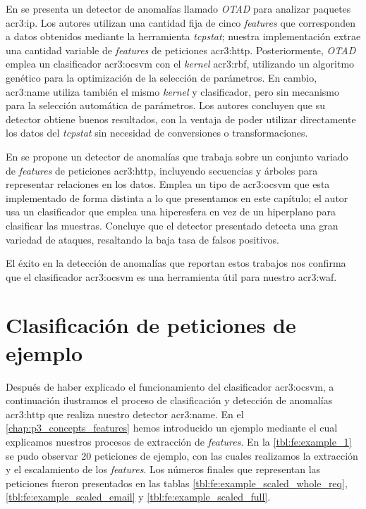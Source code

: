En \citep{tran2004one} se presenta un detector de anomalías llamado
\textit{OTAD} para analizar paquetes \gls{acr3:ip}. Los autores utilizan
una cantidad fija de cinco \textit{features} que corresponden a datos
obtenidos mediante la herramienta \textit{tcpstat}; nuestra implementación
extrae una cantidad variable de \textit{features} de peticiones
\gls{acr3:http}.
Posteriormente, \textit{OTAD} emplea un clasificador \gls{acr3:ocsvm}
con el \textit{kernel} \gls{acr3:rbf}, utilizando un algoritmo genético
para la optimización de la selección de parámetros. En cambio, \gls{acr3:name}
utiliza también el mismo \textit{kernel} y clasificador, pero sin mecanismo
para la selección automática de parámetros.
Los autores concluyen que su detector obtiene buenos resultados, con la
ventaja de poder utilizar directamente los datos del \textit{tcpstat}
sin necesidad de conversiones o transformaciones.

En \citep{rieck2009machine} se propone un detector de anomalías que trabaja
sobre un conjunto variado de \textit{features} de peticiones \gls{acr3:http},
incluyendo secuencias y árboles para representar relaciones en los datos.
Emplea un tipo de \gls{acr3:ocsvm} que esta implementado de forma distinta
a lo que presentamos en este capítulo; el autor usa un clasificador que
emplea una hiperesfera en vez de un hiperplano para clasificar las muestras.
Concluye que el detector presentado detecta una gran variedad de ataques,
resaltando la baja tasa de falsos positivos.

El éxito en la detección de anomalías que reportan estos trabajos nos
confirma que el clasificador \gls{acr3:ocsvm} es una herramienta útil
para nuestro \gls{acr3:waf}.


\section{Clasificación de peticiones de ejemplo}

Después de haber explicado el funcionamiento del clasificador \gls{acr3:ocsvm},
a continuación ilustramos el proceso de clasificación y detección de
anomalías \gls{acr3:http} que realiza nuestro detector \gls{acr3:name}.
En el \autoref{chap:p3_concepts_features} hemos introducido un ejemplo
mediante el cual explicamos nuestros procesos de extracción de \textit{features}.
En la \autoref{tbl:fe:example_1} se pudo observar 20 peticiones de ejemplo,
con las cuales realizamos la extracción y el escalamiento de los
\textit{features}. Los números finales que representan las peticiones
fueron presentados en las tablas \ref{tbl:fe:example_scaled_whole_req},
\ref{tbl:fe:example_scaled_email} y \ref{tbl:fe:example_scaled_full}.

